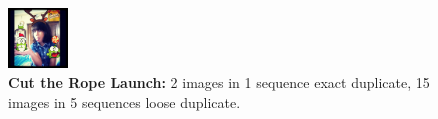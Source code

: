 \documentclass{acm_proc_article-sp}
\newcommand{\thumbheight}{16mm}
\newenvironment{thumbsequence}{}{\makebox[4mm]{}}
\begin{document}
\begin{figure}
\begin{centering}
\begin{thumbsequence}
		\includegraphics[height=\thumbheight]{resources/ropes/looseduplicate11.jpg}
	\end{thumbsequence}
	\caption{\textbf{Cut the Rope Launch:} 2 images in 1 sequence exact duplicate, 15 images in 5 sequences loose duplicate.}
	\label{fig:rope}
\end{centering}
\end{figure}
\end{document}
